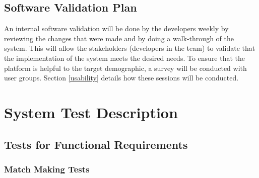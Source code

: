 \documentclass[12pt, titlepage]{article}
\begin{document}

\subsection{Software Validation Plan}

 An internal software validation will be done by the developers weekly by reviewing the changes that were made and by doing a walk-through of the system. This will allow the stakeholders (developers in the team) to validate that the implementation of the system meets the desired needs. To ensure that the platform is helpful to the target demographic, a survey will be conducted with user groups. Section \ref{usability} details how these sessions will be conducted.


\section{System Test Description}
	
\subsection{Tests for Functional Requirements}



\subsubsection{Match Making Tests}

		
\paragraph{}
\end{document}
